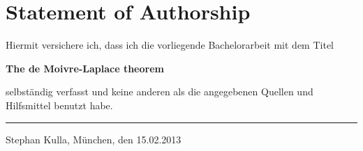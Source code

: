 \cleardoublepage
{} \label{statement_of_authorship}

\chapter*{Statement of Authorship}

Hiermit versichere ich, dass ich die vorliegende Bachelorarbeit mit dem Titel

\begin{center}
\textbf{The de Moivre-Laplace theorem}
\end{center}

\noindent selbständig verfasst und keine anderen als die angegebenen Quellen und Hilfsmittel benutzt habe.

\vspace*{2cm}

\noindent\rule{0.3\textwidth}{0.4pt}

\noindent Stephan Kulla, \newline 
München, den 15.02.2013
